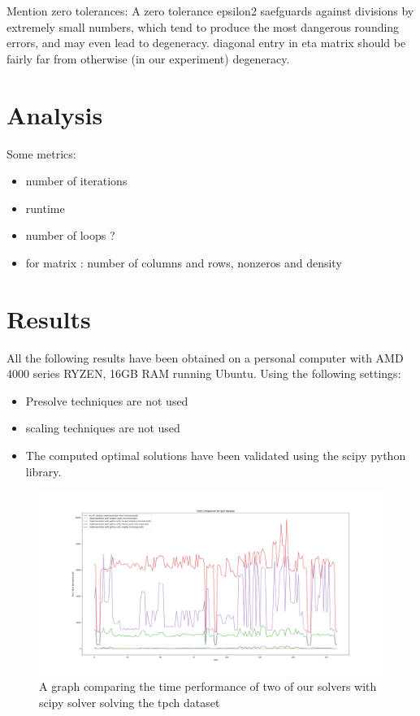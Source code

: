 Mention zero tolerances: A zero tolerance epsilon2 saefguards against divisions
by extremely small numbers, which tend to produce the most dangerous rounding errors, and
may even lead to degeneracy. diagonal entry in eta matrix should be fairly far from
otherwise (in our experiment) degeneracy.


\section{Analysis}
Some metrics:
\begin{itemize}
    \item number of iterations
    \item runtime
    \item number of loops ?
    \item for matrix : number of columns and rows, nonzeros and density
\end{itemize}

\section{Results}
All the following results have been obtained on a personal computer with AMD 4000 series
RYZEN, 16GB RAM running Ubuntu. Using the following settings:
\begin{itemize}
    \item Presolve techniques are not used
    \item scaling techniques are not used
    \item The computed optimal solutions have been validated using the scipy python library.
\end{itemize}


\begin{figure}[p] %
    \begin{adjustbox}{width=\paperwidth,center}
        \includegraphics[width=\paperwidth]{figures/all_scify_mpfi_pfi.png}
    \end{adjustbox}
    \caption{A graph comparing the time performance of two of 
    our solvers with scipy solver solving the tpch dataset}
    \label{fig:all_time_tpch}
\end{figure}


%